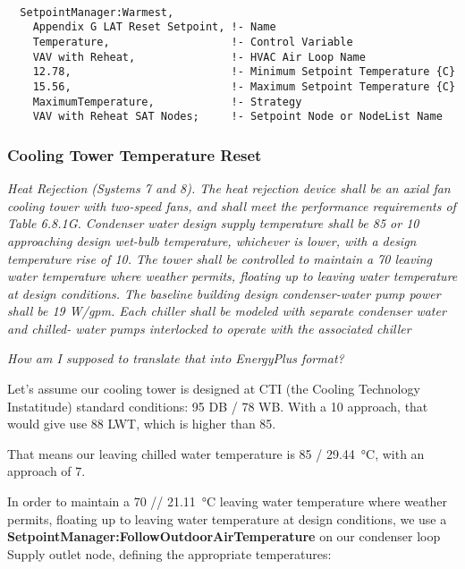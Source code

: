 \begin{lstlisting}

  SetpointManager:Warmest,
    Appendix G LAT Reset Setpoint, !- Name
    Temperature,                   !- Control Variable
    VAV with Reheat,               !- HVAC Air Loop Name
    12.78,                         !- Minimum Setpoint Temperature {C}
    15.56,                         !- Maximum Setpoint Temperature {C}
    MaximumTemperature,            !- Strategy
    VAV with Reheat SAT Nodes;     !- Setpoint Node or NodeList Name

\end{lstlisting}


\subsubsection{Cooling Tower Temperature Reset}%
\label{ssub:cooling_tower_temperature_reset}

\emph{Heat Rejection (Systems 7 and 8). The heat
rejection device shall be an axial fan cooling tower with two-speed fans, and shall meet the performance requirements of
Table 6.8.1G. Condenser water design supply temperature shall
be \SI{85}{\fahrenheit} or \SI{10}{\fahrenheit} approaching design wet-bulb temperature,
whichever is lower, with a design temperature rise of \SI{10}{\fahrenheit}. The
tower shall be controlled to maintain a \SI{70}{\fahrenheit} leaving water
temperature where weather permits, floating up to leaving water
temperature at design conditions. The baseline building design
condenser-water pump power shall be 19 W/gpm. Each chiller
shall be modeled with separate condenser water and chilled-
water pumps interlocked to operate with the associated chiller}

\emph{How am I supposed to translate that into EnergyPlus format?}

Let's assume our cooling tower is designed at CTI (the Cooling Technology Instatitude) standard conditions: \SI{95}{\fahrenheit} DB / \SI{78}{\fahrenheit} WB.
With a \SI{10}{\fahrenheit} approach, that would give use \SI{88}{\fahrenheit} LWT, which is higher than \SI{85}{\fahrenheit}.

That means our leaving chilled water temperature is \SI{85}{\fahrenheit} / \SI{29.44}{\celsius}, with an approach of \SI{7}{\fahrenheit}.

In order to   maintain a \SI{70}{\fahrenheit} // \SI{21.11}{\celsius} leaving water temperature where weather permits, floating up to leaving water
temperature at design conditions, we use a \textbf{SetpointManager:FollowOutdoorAirTemperature} on our condenser loop Supply outlet node, defining the appropriate temperatures:

